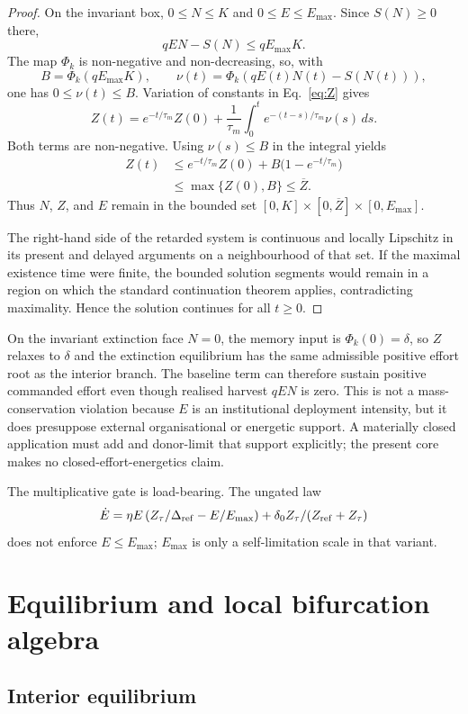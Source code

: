 \documentclass[11pt]{article}
\begin{document}
\begin{proof}
On the invariant box, $0\le N\le K$ and $0\le E\le E_{\max}$. Since $S(N)\ge0$ there,
\[
qEN-S(N)\le qE_{\max}K.
\]
The map $\Phi_k$ is non-negative and non-decreasing, so, with
\[
B=\Phi_k(qE_{\max}K),
\qquad
\nu(t)=\Phi_k(qE(t)N(t)-S(N(t))),
\]
one has $0\le\nu(t)\le B$. Variation of constants in Eq.~\eqref{eq:Z} gives
\[
Z(t)=e^{-t/\tau_m}Z(0)
 +\frac{1}{\tau_m}\int_0^t e^{-(t-s)/\tau_m}\nu(s)\,ds.
\]
Both terms are non-negative. Using $\nu(s)\le B$ in the integral yields
\begin{align*}
Z(t)
&\le e^{-t/\tau_m}Z(0)
 +B\bigl(1-e^{-t/\tau_m}\bigr)\\
&\le \max\{Z(0),B\}
\le \overline Z.
\end{align*}
Thus $N$, $Z$, and $E$ remain in the bounded set $[0,K]\times[0,\overline Z]\times[0,E_{\max}]$.

The right-hand side of the retarded system is continuous and locally Lipschitz in its present and delayed arguments on a neighbourhood of that set. If the maximal existence time were finite, the bounded solution segments would remain in a region on which the standard continuation theorem applies, contradicting maximality. Hence the solution continues for all $t\ge0$.
\end{proof}

On the invariant extinction face $N=0$, the memory input is $\Phi_k(0)=\delta$, so $Z$ relaxes to $\delta$ and the extinction equilibrium has the same admissible positive effort root as the interior branch. The baseline term can therefore sustain positive commanded effort even though realised harvest $qEN$ is zero. This is not a mass-conservation violation because $E$ is an institutional deployment intensity, but it does presuppose external organisational or energetic support. A materially closed application must add and donor-limit that support explicitly; the present core makes no closed-effort-energetics claim.

The multiplicative gate is load-bearing. The ungated law
\[
\dot E=\eta E\left(Z_\tau/\Delta_{\rm ref}-E/E_{\max}\right)
+\delta_0Z_\tau/(Z_{\rm ref}+Z_\tau)
\]
does not enforce $E\le E_{\max}$; $E_{\max}$ is only a self-limitation scale in that variant.

\section{Equilibrium and local bifurcation algebra}

\subsection{Interior equilibrium}
\end{document}
